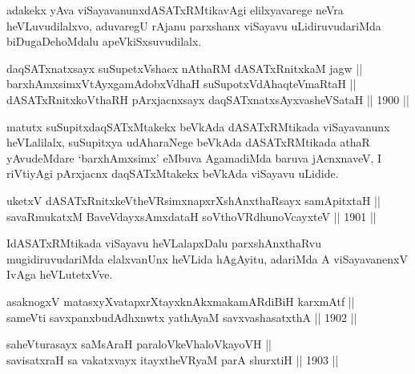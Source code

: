 \begin{artha}
adakekx yAva viSayavanunxdASATxRMtikavAgi elilxyavarege neVra
heVLuvudilalxvo, aduvaregU rAjanu parxshanx viSayavu uLidiruvudariMda
biDugaDehoMdalu apeVkiSxsuvudilalx.
\end{artha}

\begin{shl}
daqSATxnatxsayx suSupetxVshacx nAthaRM dASATxRnitxkaM jagw || \\
barxhAmxsimxVtAyxgamAdobxVdhaH suSupotxVdAhaqteVmaRtaH || \\
dASATxRnitxkoV\s thaRH pArxjacnxsayx daqSATxnatxsAyxvasheVSataH \hfill || 1900 ||
  
\end{shl}

\begin{artha}
matutx suSupitxdaqSATxMtakekx beVkAda dASATxRMtikada viSayavanunx
heVLalilalx, suSupitxya udAharaNege beVkAda dASATxRMtikada athaR
yAvudeMdare `barxhAmxsimx' eMbuva AgamadiMda baruva jAcnxnaveV, I
riVtiyAgi pArxjacnx daqSATxMtakekx beVkAda viSayavu uLidide.
\end{artha}

\begin{shl}
uketxV dASATxRnitxkeV\s theVR\s simxnapxrXshAnxthaRsayx samApitxtaH || \\
savaRmukatxM BaveVdayxsAmxdataH soV\s thoVR\s dhunoVcayxteV \hfill || 1901 ||
  
\end{shl}

\begin{artha}
IdASATxRMtikada viSayavu heVLalapxDalu parxshAnxthaRvu
mugidiruvudariMda elalxvanUnx heVLida hAgAyitu, adariMda A
viSayavanenxV IvAga heVLutetxVve.
\end{artha}

\begin{shl}
asaknogxV matasxyXvatapxrXtayxknAkxmakamARdiBiH karxmAtf || \\
sameVti savxpanxbudAdhxnwtx yathA\s yaM savxvashasatxthA \hfill || 1902 ||
  
\end{shl}

\begin{shl}
saheVturasayx saMsAraH paraloVkeVhaloVkayoVH || \\
savisatxraH sa vakatxvayx itayxtheVRyaM parA shurxtiH \hfill || 1903 ||
  
\end{shl}

